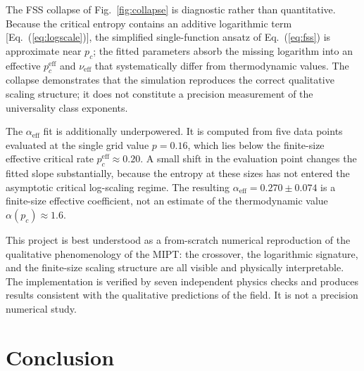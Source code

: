 \documentclass[twocolumn,prl,aps,floatfix]{revtex4-2}
\begin{document}
The FSS collapse of Fig.~\ref{fig:collapse} is diagnostic rather than
quantitative.
Because the critical entropy contains an additive logarithmic term
[Eq.~(\ref{eq:logscale})], the simplified single-function ansatz of
Eq.~(\ref{eq:fss}) is approximate near $p_c$; the fitted parameters absorb the
missing logarithm into an effective $p_c^{\mathrm{eff}}$ and
$\nu_{\mathrm{eff}}$ that systematically differ from thermodynamic values.
The collapse demonstrates that the simulation reproduces the correct qualitative
scaling structure; it does not constitute a precision measurement of the
universality class exponents.

The $\alpha_{\mathrm{eff}}$ fit is additionally underpowered.
It is computed from five data points evaluated at the single grid value
$p = 0.16$, which lies below the finite-size effective critical rate
$p_c^{\mathrm{eff}} \approx 0.20$.
A small shift in the evaluation point changes the fitted slope substantially,
because the entropy at these sizes has not entered the asymptotic critical
log-scaling regime.
The resulting $\alpha_{\mathrm{eff}} = 0.270 \pm 0.074$ is a finite-size
effective coefficient, not an estimate of the thermodynamic value
$\alpha(p_c) \approx 1.6$.

This project is best understood as a from-scratch numerical reproduction of the
qualitative phenomenology of the MIPT: the crossover, the logarithmic signature,
and the finite-size scaling structure are all visible and physically
interpretable.
The implementation is verified by seven independent physics checks and produces
results consistent with the qualitative predictions of the field.
It is not a precision numerical study.

\section{Conclusion}
\label{sec:conclusion}
\end{document}
